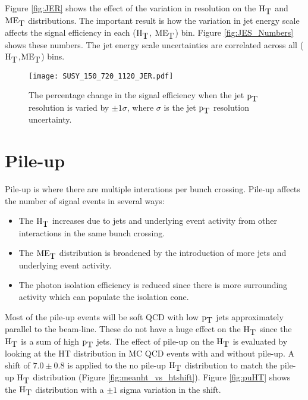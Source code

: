 Figure \ref{fig:JER} shows the effect of the variation in resolution on the
$\mbox{H}_{\mbox{T}}$ and $\mbox{ME}_{\mbox{T}}$ distributions. The important result is how the variation in jet
energy scale affects the signal efficiency in each ($\mbox{H}_{\mbox{T}}$, $\mbox{ME}_{\mbox{T}}$) bin. Figure 
\ref{fig:JES_Numbers} shows these numbers. The jet energy scale uncertainties 
are correlated across all ($\mbox{H}_{\mbox{T}}$,$\mbox{ME}_{\mbox{T}}$) bins.

\begin{figure}
\begin{center}
\texttt{[image: SUSY\_150\_720\_1120\_JER.pdf]}
\end{center}
\caption{The percentage change in the signal efficiency when the jet $\mbox{p}_{\mbox{T}}$
resolution is varied by $\pm1\sigma$, where $\sigma$ is the jet $\mbox{p}_{\mbox{T}}$ resolution 
uncertainty.}
\label{fig:JER_Numbers}
\end{figure}

\section{Pile-up}

Pile-up is where there are multiple interations per bunch crossing. 
Pile-up affects the number of signal events in several ways:

\begin{itemize}
\item The $\mbox{H}_{\mbox{T}}$ increases due to jets and underlying event activity from other 
interactions in the same bunch crossing.
\item The $\mbox{ME}_{\mbox{T}}$ distribution is broadened by the introduction of more jets and
underlying event activity.
\item The photon isolation efficiency is reduced since there is more 
surrounding activity which can populate the isolation cone.
\end{itemize}

Most of the pile-up events will be soft QCD with low $\mbox{p}_{\mbox{T}}$ jets approximately 
parallel to the beam-line. These do not have a huge effect on the $\mbox{H}_{\mbox{T}}$ since 
the $\mbox{H}_{\mbox{T}}$ is a sum of high $\mbox{p}_{\mbox{T}}$ jets. The effect of pile-up on the $\mbox{H}_{\mbox{T}}$ is 
evaluated by looking at the HT distribution in MC QCD events with and without 
pile-up. A shift of $7.0\pm0.8$ is applied to the no pile-up $\mbox{H}_{\mbox{T}}$ distribution 
to match the pile-up $\mbox{H}_{\mbox{T}}$ distribution (Figure \ref{fig:meanht_vs_htshift}). 
Figure \ref{fig:puHT} shows the $\mbox{H}_{\mbox{T}}$ distribution with a $\pm 1$ sigma 
variation in the shift. \\

